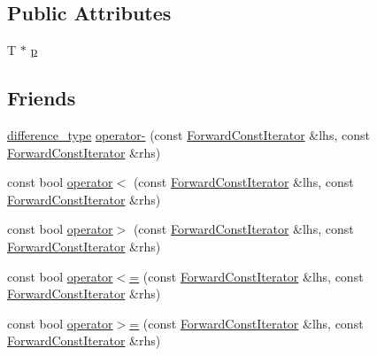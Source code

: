 \subsection*{Public Attributes}
\begin{DoxyCompactItemize}
\item 
T $\ast$ \hyperlink{classprism_1_1containers_1_1_forward_const_iterator_a26647b955a51f4fb4d29d1b06dd75cd9}{p}
\end{DoxyCompactItemize}
\subsection*{Friends}
\begin{DoxyCompactItemize}
\item 
\hyperlink{classprism_1_1containers_1_1_forward_const_iterator_ad3dab41615afe9dba6b9a2e88721b1da}{difference\+\_\+type} \hyperlink{classprism_1_1containers_1_1_forward_const_iterator_ae77905649fbc553b53ac49c23262d818}{operator-\/} (const \hyperlink{classprism_1_1containers_1_1_forward_const_iterator}{Forward\+Const\+Iterator} \&lhs, const \hyperlink{classprism_1_1containers_1_1_forward_const_iterator}{Forward\+Const\+Iterator} \&rhs)
\item 
const bool \hyperlink{classprism_1_1containers_1_1_forward_const_iterator_a9eb40ce48ff747c184f7ac37ada4dcf2}{operator$<$} (const \hyperlink{classprism_1_1containers_1_1_forward_const_iterator}{Forward\+Const\+Iterator} \&lhs, const \hyperlink{classprism_1_1containers_1_1_forward_const_iterator}{Forward\+Const\+Iterator} \&rhs)
\item 
const bool \hyperlink{classprism_1_1containers_1_1_forward_const_iterator_a46cd17a5b9f20b1594ea9c3cdb2662f1}{operator$>$} (const \hyperlink{classprism_1_1containers_1_1_forward_const_iterator}{Forward\+Const\+Iterator} \&lhs, const \hyperlink{classprism_1_1containers_1_1_forward_const_iterator}{Forward\+Const\+Iterator} \&rhs)
\item 
const bool \hyperlink{classprism_1_1containers_1_1_forward_const_iterator_a82457c042ee5a0d20f1b2efa9452717f}{operator$<$=} (const \hyperlink{classprism_1_1containers_1_1_forward_const_iterator}{Forward\+Const\+Iterator} \&lhs, const \hyperlink{classprism_1_1containers_1_1_forward_const_iterator}{Forward\+Const\+Iterator} \&rhs)
\item 
const bool \hyperlink{classprism_1_1containers_1_1_forward_const_iterator_a34fc2d898f75bd850e25c645ebb05336}{operator$>$=} (const \hyperlink{classprism_1_1containers_1_1_forward_const_iterator}{Forward\+Const\+Iterator} \&lhs, const \hyperlink{classprism_1_1containers_1_1_forward_const_iterator}{Forward\+Const\+Iterator} \&rhs)
\end{DoxyCompactItemize}


